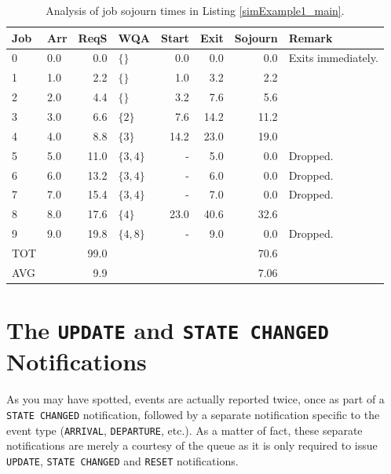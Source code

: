 \documentclass[12pt]{book}
\begin{document}
\begin{table}[h]
\caption{Analysis of job sojourn times in Listing \ref{simExample1_main}.}
\label{simExample1_analysis}
\begin{tabular}{|l|l|r|l|r|r|r|l|}
\hline
Job & Arr & ReqS & WQA & Start & Exit & Sojourn & Remark \\
\hline
\hline
0 & 0.0 &  0.0 & $\{      \}$ & 0.0  &  0.0 &  0.0 & Exits immediately. \\ \hline
1 & 1.0 &  2.2 & $\{      \}$ & 1.0  &  3.2 &  2.2 &                    \\ \hline
2 & 2.0 &  4.4 & $\{      \}$ & 3.2  &  7.6 &  5.6 &                    \\ \hline
3 & 3.0 &  6.6 & $\{ 2    \}$ & 7.6  & 14.2 & 11.2 &                    \\ \hline
4 & 4.0 &  8.8 & $\{ 3    \}$ & 14.2 & 23.0 & 19.0 &                    \\ \hline
5 & 5.0 & 11.0 & $\{ 3, 4 \}$ & -    &  5.0 &  0.0 & Dropped.           \\ \hline
6 & 6.0 & 13.2 & $\{ 3, 4 \}$ & -    &  6.0 &  0.0 & Dropped.           \\ \hline
7 & 7.0 & 15.4 & $\{ 3, 4 \}$ & -    &  7.0 &  0.0 & Dropped.           \\ \hline
8 & 8.0 & 17.6 & $\{ 4    \}$ & 23.0 & 40.6 & 32.6 &                    \\ \hline
9 & 9.0 & 19.8 & $\{ 4, 8 \}$ & -    &  9.0 &  0.0 & Dropped.           \\ \hline
\hline
TOT   & & 99.0 &              &      &      & 70.6 &                    \\ \hline
\hline
AVG   & &  9.9 &              &      &      & 7.06 &                    \\ \hline
\hline
\end{tabular}
\end{table}

\section{The \lstinline|UPDATE| and \lstinline|STATE CHANGED| Notifications}

As you may have spotted,
  events are actually reported twice,
  once as part of a \lstinline|STATE CHANGED| notification,
  followed by a separate notification specific to the event type
  (\lstinline-ARRIVAL-, \lstinline-DEPARTURE-, etc.).
As a matter of fact, these separate notifications are merely a courtesy
  of the queue as it is only required to issue
  \lstinline|UPDATE|, \lstinline|STATE CHANGED| and \lstinline|RESET| notifications.
\end{document}
